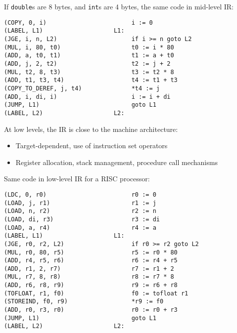\documentclass[../index.tex]{subfiles}
\begin{document}
\begin{frame}[fragile]{\currenttitle}
  \vspace*{1em}
  If \texttt{double}s are 8 bytes, and \texttt{int}s are 4 bytes, the same code
  in mid-level IR: \\[1.5em]

  \begin{lstlisting}[xleftmargin=0.5cm]
(COPY, 0, i)                        i := 0
(LABEL, L1)                    L1:
(JGE, i, n, L2)                     if i >= n goto L2
(MUL, i, 80, t0)                    t0 := i * 80
(ADD, a, t0, t1)                    t1 := a + t0
(ADD, j, 2, t2)                     t2 := j + 2
(MUL, t2, 8, t3)                    t3 := t2 * 8
(ADD, t1, t3, t4)                   t4 := t1 + t3
(COPY_TO_DEREF, j, t4)              *t4 := j
(ADD, i, di, i)                     i := i + di
(JUMP, L1)                          goto L1
(LABEL, L2)                    L2:
  \end{lstlisting}

\end{frame}
  
\begin{frame}[fragile]{\currenttitle}
  At low levels, the IR is close to the machine architecture:

  \begin{itemize}
    \item Target-dependent, use of instruction set operators
    \item Register allocation, stack management, procedure call mechanisms
  \end{itemize}
\end{frame}
  
\begin{frame}[fragile]{\currenttitle}
  \vspace*{1em}
  Same code in low-level IR for a RISC processor: \\[1em]

  \begin{lstlisting}[basicstyle=\ttfamily\scriptsize]
(LDC, 0, r0)                        r0 := 0
(LOAD, j, r1)                       r1 := j
(LOAD, n, r2)                       r2 := n
(LOAD, di, r3)                      r3 := di
(LOAD, a, r4)                       r4 := a
(LABEL, L1)                    L1:
(JGE, r0, r2, L2)                   if r0 >= r2 goto L2
(MUL, r0, 80, r5)                   r5 := r0 * 80
(ADD, r4, r5, r6)                   r6 := r4 + r5
(ADD, r1, 2, r7)                    r7 := r1 + 2
(MUL, r7, 8, r8)                    r8 := r7 * 8
(ADD, r6, r8, r9)                   r9 := r6 + r8
(TOFLOAT, r1, f0)                   f0 := tofloat r1
(STOREIND, f0, r9)                  *r9 := f0
(ADD, r0, r3, r0)                   r0 := r0 + r3
(JUMP, L1)                          goto L1
(LABEL, L2)                    L2:
  \end{lstlisting}
\end{frame}
  
\end{document}
